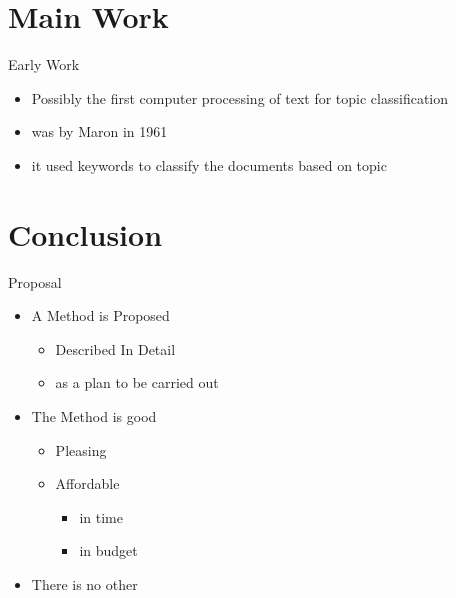 \documentclass[12pt,landscape,english]{beamer}
\begin{document}
\section{Main Work}
\begin{frame}{Early Work}
	\begin{itemize}
		\item Possibly the first computer processing of text for topic classification
		\item was by Maron in 1961
		\item it used keywords to classify the documents based on topic
	\end{itemize}
\end{frame}






\section{Conclusion}
\begin{frame}{Proposal}
	\begin{itemize}
		\item A Method is Proposed
		\begin{itemize}
			\item Described In Detail
			\item as a plan to be carried out
		\end{itemize}
		\item The Method is good
		\begin{itemize}
			\item Pleasing
			\item Affordable
			\begin{itemize}
				\item in time
				\item in budget 
			\end{itemize}
		\end{itemize}
		\item There is no other
	\end{itemize}

\end{frame}
\end{document}
